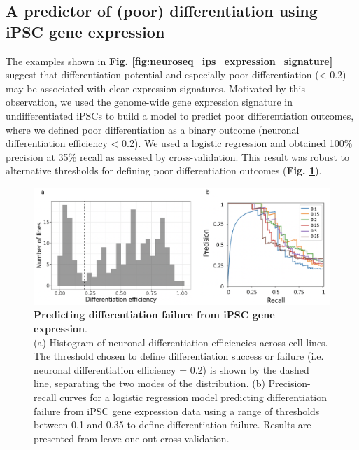 \newpage

\subsection{A predictor of (poor) differentiation using iPSC gene expression}
\label{sec:neuro_diff_eff_predictor}

The examples shown in \textbf{Fig. \ref{fig:neuroseq_ips_expression_signature}} suggest that differentiation potential and especially poor differentiation (< 0.2) may be associated with clear expression signatures.
Motivated by this observation, we used the genome-wide gene expression signature in undifferentiated iPSCs to build a model to predict poor differentiation outcomes, where we defined poor differentiation as a binary outcome (neuronal differentiation efficiency < 0.2).
We used a logistic regression and obtained 100\% precision at 35\% recall as assessed by cross-validation. 
This result was robust to alternative thresholds for defining poor differentiation outcomes (\textbf{Fig. \ref{fig:neuroseq_diff_eff_predictor}}). 

\begin{figure}[h]
\centering
\includegraphics[width=15.5cm]{Chapter5/Fig/neuroseq_diff_eff_predict.png}
\caption[Predicting differentiation failure from iPSC gene expression]{\textbf{Predicting differentiation failure from iPSC gene expression}.\\
(a) Histogram of neuronal differentiation efficiencies across cell lines. 
The threshold chosen to define differentiation success or failure (i.e. neuronal differentiation efficiency = 0.2) is shown by the dashed line, separating the two modes of the distribution. 
(b) Precision-recall curves for a logistic regression model predicting differentiation failure from iPSC gene expression data \cite{bonder2019systematic} using a range of thresholds between 0.1 and 0.35 to define differentiation failure. 
Results are presented from leave-one-out cross validation.}
\label{fig:neuroseq_diff_eff_predictor}
\end{figure}

